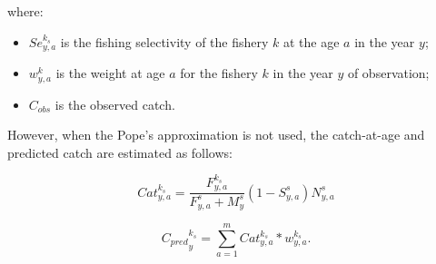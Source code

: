 \documentclass{article}
\begin{document}
where:        
\begin{itemize}

    \item $Se_{y,a}^{k_s}$ is the fishing selectivity of the fishery $k$ at the age $a$ in the year $y$;
    
    \item $w_{y,a}^{k}$ is the weight at age $a$ for the fishery $k$ in the year $y$ of observation;
    
    \item $C_{obs}$ is the observed catch.
    
    

 
\end{itemize}

However, when the Pope's approximation is not used, the catch-at-age and predicted catch are estimated as follows:

\begin{equation}
Cat^{k_s}_{y,a}=\dfrac{F^{k_s}_{y,a}}{F^s_{y,a}+M^{s}_{y}}\left(1-S^s_{y,a}\right)N^s_{y,a}
\end{equation}


\begin{equation}
{C_{pred}}^{k_s}_y=\sum_{a=1}^{m}Cat^{k_s}_{y,a}*w_{y,a}^{k_s}.
\end{equation}
\end{document}
